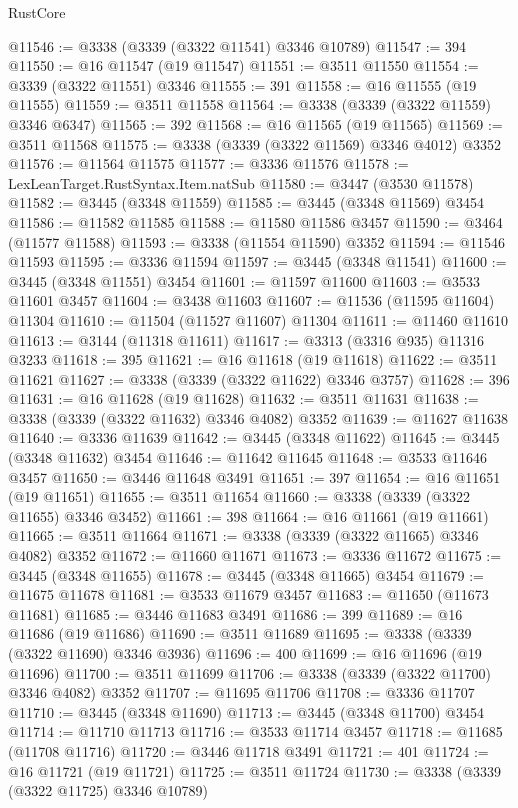 \begin{lexlean}{RustCore}
\begin{coremodule}
@11546 := @3338 (@3339 (@3322 @11541) @3346 @10789)
@11547 := 394
@11550 := @16 @11547 (@19 @11547)
@11551 := @3511 @11550
@11554 := @3339 (@3322 @11551) @3346
@11555 := 391
@11558 := @16 @11555 (@19 @11555)
@11559 := @3511 @11558
@11564 := @3338 (@3339 (@3322 @11559) @3346 @6347)
@11565 := 392
@11568 := @16 @11565 (@19 @11565)
@11569 := @3511 @11568
@11575 := @3338 (@3339 (@3322 @11569) @3346 @4012) @3352
@11576 := @11564 @11575
@11577 := @3336 @11576
@11578 := LexLeanTarget.RustSyntax.Item.natSub
@11580 := @3447 (@3530 @11578)
@11582 := @3445 (@3348 @11559)
@11585 := @3445 (@3348 @11569) @3454
@11586 := @11582 @11585
@11588 := @11580 @11586 @3457
@11590 := @3464 (@11577 @11588)
@11593 := @3338 (@11554 @11590) @3352
@11594 := @11546 @11593
@11595 := @3336 @11594
@11597 := @3445 (@3348 @11541)
@11600 := @3445 (@3348 @11551) @3454
@11601 := @11597 @11600
@11603 := @3533 @11601 @3457
@11604 := @3438 @11603
@11607 := @11536 (@11595 @11604) @11304
@11610 := @11504 (@11527 @11607) @11304
@11611 := @11460 @11610
@11613 := @3144 (@11318 @11611)
@11617 := @3313 (@3316 @935) @11316 @3233
@11618 := 395
@11621 := @16 @11618 (@19 @11618)
@11622 := @3511 @11621
@11627 := @3338 (@3339 (@3322 @11622) @3346 @3757)
@11628 := 396
@11631 := @16 @11628 (@19 @11628)
@11632 := @3511 @11631
@11638 := @3338 (@3339 (@3322 @11632) @3346 @4082) @3352
@11639 := @11627 @11638
@11640 := @3336 @11639
@11642 := @3445 (@3348 @11622)
@11645 := @3445 (@3348 @11632) @3454
@11646 := @11642 @11645
@11648 := @3533 @11646 @3457
@11650 := @3446 @11648 @3491
@11651 := 397
@11654 := @16 @11651 (@19 @11651)
@11655 := @3511 @11654
@11660 := @3338 (@3339 (@3322 @11655) @3346 @3452)
@11661 := 398
@11664 := @16 @11661 (@19 @11661)
@11665 := @3511 @11664
@11671 := @3338 (@3339 (@3322 @11665) @3346 @4082) @3352
@11672 := @11660 @11671
@11673 := @3336 @11672
@11675 := @3445 (@3348 @11655)
@11678 := @3445 (@3348 @11665) @3454
@11679 := @11675 @11678
@11681 := @3533 @11679 @3457
@11683 := @11650 (@11673 @11681)
@11685 := @3446 @11683 @3491
@11686 := 399
@11689 := @16 @11686 (@19 @11686)
@11690 := @3511 @11689
@11695 := @3338 (@3339 (@3322 @11690) @3346 @3936)
@11696 := 400
@11699 := @16 @11696 (@19 @11696)
@11700 := @3511 @11699
@11706 := @3338 (@3339 (@3322 @11700) @3346 @4082) @3352
@11707 := @11695 @11706
@11708 := @3336 @11707
@11710 := @3445 (@3348 @11690)
@11713 := @3445 (@3348 @11700) @3454
@11714 := @11710 @11713
@11716 := @3533 @11714 @3457
@11718 := @11685 (@11708 @11716)
@11720 := @3446 @11718 @3491
@11721 := 401
@11724 := @16 @11721 (@19 @11721)
@11725 := @3511 @11724
@11730 := @3338 (@3339 (@3322 @11725) @3346 @10789)

\end{coremodule}
\end{lexlean}
